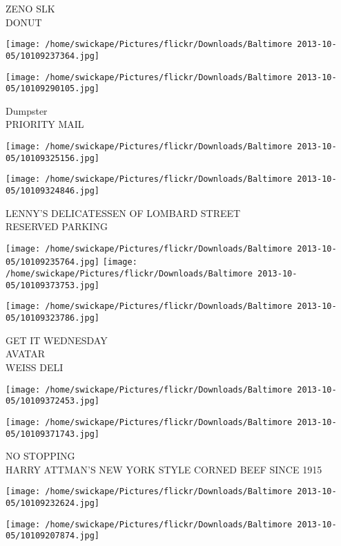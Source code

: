 \documentclass[10pt,letterpaper]{article}
\begin{document}
ZENO SLK\\
DONUT
\pagebreak

\texttt{[image: /home/swickape/Pictures/flickr/Downloads/Baltimore 2013-10-05/10109237364.jpg]}

\vspace{0.25in}
\texttt{[image: /home/swickape/Pictures/flickr/Downloads/Baltimore 2013-10-05/10109290105.jpg]}

Dumpster\\
PRIORITY MAIL
\pagebreak

\texttt{[image: /home/swickape/Pictures/flickr/Downloads/Baltimore 2013-10-05/10109325156.jpg]}

\vspace{0.25in}
\texttt{[image: /home/swickape/Pictures/flickr/Downloads/Baltimore 2013-10-05/10109324846.jpg]}

LENNY'S DELICATESSEN OF LOMBARD STREET\\
RESERVED PARKING
\pagebreak

\texttt{[image: /home/swickape/Pictures/flickr/Downloads/Baltimore 2013-10-05/10109235764.jpg]}
\texttt{[image: /home/swickape/Pictures/flickr/Downloads/Baltimore 2013-10-05/10109373753.jpg]}

\vspace{0.25in}
\texttt{[image: /home/swickape/Pictures/flickr/Downloads/Baltimore 2013-10-05/10109323786.jpg]}

GET IT WEDNESDAY\\
AVATAR\\
WEISS DELI
\pagebreak

\texttt{[image: /home/swickape/Pictures/flickr/Downloads/Baltimore 2013-10-05/10109372453.jpg]}

\vspace{0.25in}
\texttt{[image: /home/swickape/Pictures/flickr/Downloads/Baltimore 2013-10-05/10109371743.jpg]}

NO STOPPING\\
HARRY ATTMAN'S NEW YORK STYLE CORNED BEEF SINCE 1915
\pagebreak

\texttt{[image: /home/swickape/Pictures/flickr/Downloads/Baltimore 2013-10-05/10109232624.jpg]}

\vspace{0.25in}
\texttt{[image: /home/swickape/Pictures/flickr/Downloads/Baltimore 2013-10-05/10109207874.jpg]}
\end{document}
